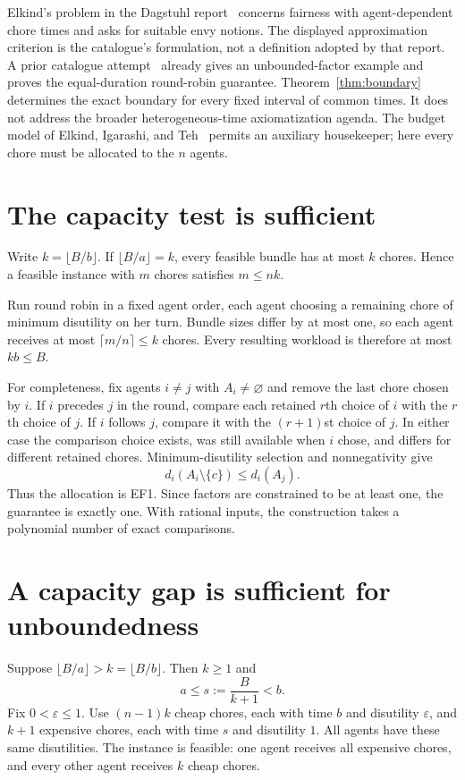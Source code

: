 \documentclass[11pt]{article}
\begin{document}
Elkind's problem in the Dagstuhl report~\cite[Section~4.1]{elkind} concerns
fairness with agent-dependent chore times and asks for suitable envy notions.
The displayed approximation criterion is the catalogue's formulation, not a
definition adopted by that report. A prior catalogue attempt~\cite{prior}
already gives an unbounded-factor example and proves the equal-duration
round-robin guarantee. Theorem~\ref{thm:boundary} determines the exact boundary
for every fixed interval of common times. It does not address the broader
heterogeneous-time axiomatization agenda. The budget model of
Elkind, Igarashi, and Teh~\cite[Section~2.1]{eit} permits an auxiliary
housekeeper; here every chore must be allocated to the $n$ agents.

\section{The capacity test is sufficient}

Write $k=\lfloor B/b\rfloor$. If $\lfloor B/a\rfloor=k$, every feasible
bundle has at most $k$ chores. Hence a feasible instance with $m$ chores
satisfies $m\le nk$.

Run round robin in a fixed agent order, each agent choosing a remaining chore
of minimum disutility on her turn. Bundle sizes differ by at most one, so each
agent receives at most $\lceil m/n\rceil\le k$ chores. Every resulting workload
is therefore at most $kb\le B$.

For completeness, fix agents $i\ne j$ with $A_i\ne\varnothing$ and remove
the last chore chosen by $i$. If $i$ precedes $j$ in the round, compare each
retained $r$th choice of $i$ with the $r$th choice of $j$. If $i$ follows $j$,
compare it with the $(r+1)$st choice of $j$. In either case the comparison
choice exists, was still available when $i$ chose, and differs for different
retained chores. Minimum-disutility selection and nonnegativity give
\[
                    d_i(A_i\setminus\{c\})\le d_i(A_j).
\]
Thus the allocation is EF1. Since factors are constrained to be at least one,
the guarantee is exactly one. With rational inputs, the construction takes a
polynomial number of exact comparisons.

\section{A capacity gap is sufficient for unboundedness}

Suppose $\lfloor B/a\rfloor>k=\lfloor B/b\rfloor$. Then $k\ge1$ and
\[
                       a\le s:=\frac{B}{k+1}<b.
\]
Fix $0<\varepsilon\le1$. Use $(n-1)k$ cheap chores, each with time $b$
and disutility $\varepsilon$, and $k+1$ expensive chores, each with time $s$
and disutility $1$. All agents have these same disutilities. The instance is
feasible: one agent receives all expensive chores, and every other agent
receives $k$ cheap chores.
\end{document}

